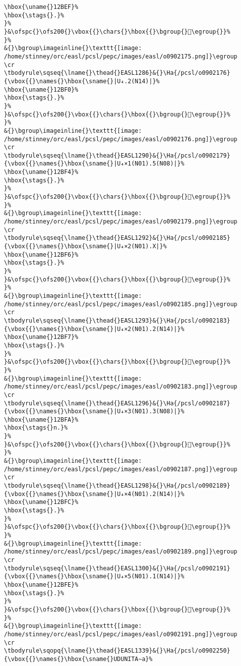 \begin{verbatim}
\hbox{\uname{}12BEF}%
\hbox{\stags{}.}%
}%
}&\ofspc{}\ofs200{}\vbox{{}\chars{}\hbox{{}\bgroup{}𒯯\egroup{}}%
}%
&{}\bgroup\imageinline{}\texttt{[image: /home/stinney/orc/easl/pcsl/pepc/images/easl/o0902175.png]}\egroup
\cr
\tbodyrule\sqseq{\lname{}\thead{}EASL1286}&{}\Ha{/pcsl/o0902176}{\vbox{{}\names{}\hbox{\sname{}|U₄.2(N14)|}%
\hbox{\uname{}12BF0}%
\hbox{\stags{}.}%
}%
}&\ofspc{}\ofs200{}\vbox{{}\chars{}\hbox{{}\bgroup{}𒯰\egroup{}}%
}%
&{}\bgroup\imageinline{}\texttt{[image: /home/stinney/orc/easl/pcsl/pepc/images/easl/o0902176.png]}\egroup
\cr
\tbodyrule\sqseq{\lname{}\thead{}EASL1290}&{}\Ha{/pcsl/o0902179}{\vbox{{}\names{}\hbox{\sname{}|U₄×1(N01).5(N08)|}%
\hbox{\uname{}12BF4}%
\hbox{\stags{}.}%
}%
}&\ofspc{}\ofs200{}\vbox{{}\chars{}\hbox{{}\bgroup{}𒯴\egroup{}}%
}%
&{}\bgroup\imageinline{}\texttt{[image: /home/stinney/orc/easl/pcsl/pepc/images/easl/o0902179.png]}\egroup
\cr
\tbodyrule\sqseq{\lname{}\thead{}EASL1292}&{}\Ha{/pcsl/o0902185}{\vbox{{}\names{}\hbox{\sname{}|U₄×2(N01).X|}%
\hbox{\uname{}12BF6}%
\hbox{\stags{}.}%
}%
}&\ofspc{}\ofs200{}\vbox{{}\chars{}\hbox{{}\bgroup{}𒯶\egroup{}}%
}%
&{}\bgroup\imageinline{}\texttt{[image: /home/stinney/orc/easl/pcsl/pepc/images/easl/o0902185.png]}\egroup
\cr
\tbodyrule\sqseq{\lname{}\thead{}EASL1293}&{}\Ha{/pcsl/o0902183}{\vbox{{}\names{}\hbox{\sname{}|U₄×2(N01).2(N14)|}%
\hbox{\uname{}12BF7}%
\hbox{\stags{}.}%
}%
}&\ofspc{}\ofs200{}\vbox{{}\chars{}\hbox{{}\bgroup{}𒯷\egroup{}}%
}%
&{}\bgroup\imageinline{}\texttt{[image: /home/stinney/orc/easl/pcsl/pepc/images/easl/o0902183.png]}\egroup
\cr
\tbodyrule\sqseq{\lname{}\thead{}EASL1296}&{}\Ha{/pcsl/o0902187}{\vbox{{}\names{}\hbox{\sname{}|U₄×3(N01).3(N08)|}%
\hbox{\uname{}12BFA}%
\hbox{\stags{}n.}%
}%
}&\ofspc{}\ofs200{}\vbox{{}\chars{}\hbox{{}\bgroup{}𒯺\egroup{}}%
}%
&{}\bgroup\imageinline{}\texttt{[image: /home/stinney/orc/easl/pcsl/pepc/images/easl/o0902187.png]}\egroup
\cr
\tbodyrule\sqseq{\lname{}\thead{}EASL1298}&{}\Ha{/pcsl/o0902189}{\vbox{{}\names{}\hbox{\sname{}|U₄×4(N01).2(N14)|}%
\hbox{\uname{}12BFC}%
\hbox{\stags{}.}%
}%
}&\ofspc{}\ofs200{}\vbox{{}\chars{}\hbox{{}\bgroup{}𒯼\egroup{}}%
}%
&{}\bgroup\imageinline{}\texttt{[image: /home/stinney/orc/easl/pcsl/pepc/images/easl/o0902189.png]}\egroup
\cr
\tbodyrule\sqseq{\lname{}\thead{}EASL1300}&{}\Ha{/pcsl/o0902191}{\vbox{{}\names{}\hbox{\sname{}|U₄×5(N01).1(N14)|}%
\hbox{\uname{}12BFE}%
\hbox{\stags{}.}%
}%
}&\ofspc{}\ofs200{}\vbox{{}\chars{}\hbox{{}\bgroup{}𒯾\egroup{}}%
}%
&{}\bgroup\imageinline{}\texttt{[image: /home/stinney/orc/easl/pcsl/pepc/images/easl/o0902191.png]}\egroup
\cr
\tbodyrule\sqopq{\lname{}\thead{}EASL1339}&{}\Ha{/pcsl/o0902250}{\vbox{{}\names{}\hbox{\sname{}UDUNITA∼a}%

\end{verbatim}
